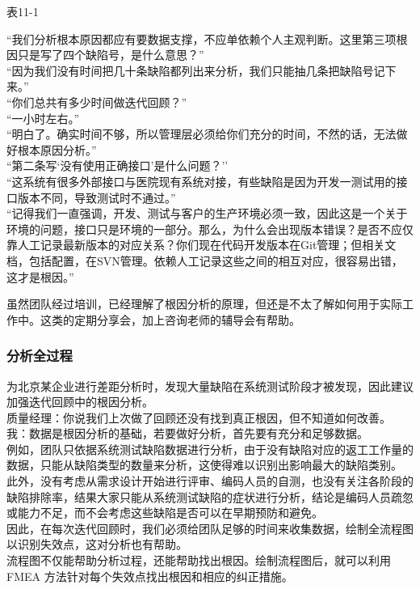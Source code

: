表11-1

``我们分析根本原因都应有要数据支撑，不应单依赖个人主观判断。这里第三项根因只是写了四个缺陷号，是什么意思？''\\
``因为我们没有时间把几十条缺陷都列出来分析，我们只能抽几条把缺陷号记下来。''\\
``你们总共有多少时间做迭代回顾？''\\
``一小时左右。''\\
``明白了。确实时间不够，所以管理层必须给你们充分的时间，不然的话，无法做好根本原因分析。''\\
``第二条写`没有使用正确接口'是什么问题？''\\
``这系统有很多外部接口与医院现有系统对接，有些缺陷是因为开发一测试用的接口版本不同，导致测试时不通过。''\\
``记得我们一直强调，开发、测试与客户的生产环境必须一致，因此这是一个关于环境的问题，接口只是环境的一部分。那么，为什么会出现版本错误？是否不应仅靠人工记录最新版本的对应关系？你们现在代码开发版本在Git管理；但相关文档，包括配置，在SVN管理。依赖人工记录这些之间的相互对应，很容易出错，这才是根因。''

虽然团队经过培训，已经理解了根因分析的原理，但还是不太了解如何用于实际工作中。这类的定期分享会，加上咨询老师的辅导会有帮助。

\hypertarget{ux5206ux6790ux5168ux8fc7ux7a0b}{%
\subsubsection{分析全过程}\label{ux5206ux6790ux5168ux8fc7ux7a0b}}

为北京某企业进行差距分析时，发现大量缺陷在系统测试阶段才被发现，因此建议加强迭代回顾中的根因分析。\\
质量经理：你说我们上次做了回顾还没有找到真正根因，但不知道如何改善。\\
我：数据是根因分析的基础，若要做好分析，首先要有充分和足够数据。\\
例如，团队只依据系统测试缺陷数据进行分析，由于没有缺陷对应的返工工作量的数据，只能从缺陷类型的数量来分析，这使得难以识别出影响最大的缺陷类别。\\
此外，没有考虑从需求设计开始进行评审、编码人员的自测，也没有关注各阶段的缺陷排除率，结果大家只能从系统测试缺陷的症状进行分析，结论是编码人员疏忽或能力不足，而不会考虑这些缺陷是否可以在早期预防和避免。\\
因此，在每次迭代回顾时，我们必须给团队足够的时间来收集数据，绘制全流程图以识别失效点，这对分析也有帮助。\\
流程图不仅能帮助分析过程，还能帮助找出根因。绘制流程图后，就可以利用
FMEA 方法针对每个失效点找出根因和相应的纠正措施。

